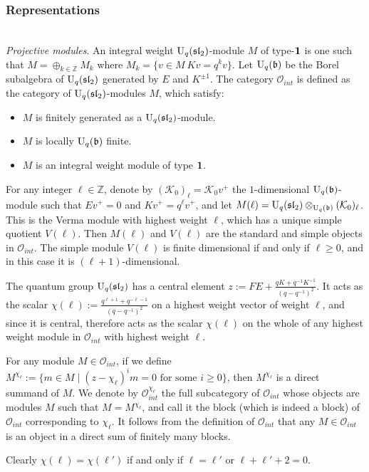\documentclass[12pt]{amsart}
\theoremstyle{definition}
\theoremstyle{remark}
\numberwithin{equation}{section}
\newcommand{\Z}{{\mathbb Z}}
\newcommand{\CO}{{\mathcal O}}
\newcommand{\CK}{{\mathcal K}}
\newcommand{\mf}{\mathfrak}
\newcommand{\fb}{{\mf b}}
\newcommand{\U}{{\rm{U}}}
\newcommand{\fsl}{{\mathfrak {sl}}}
\begin{document}
%
%
\subsubsection{Representations}{\  }\\
%
%
{\em Projective modules}.
An integral weight $\U_q(\fsl_2)$-module $M$ of type-${\bf 1}$ is one such that $M=\oplus_{k\in \Z}M_k$ where 
$M_k=\{v\in M\ K v= q^k v \}$. 
Let $\U_q(\fb)$ be the Borel subalgebra of $\U_q(\fsl_2)$ generated by $E$ and $K^{\pm 1}$.  
The category $\CO_{int}$ is defined as the category of  $\U_q(\fsl_2)$-modules $M$, which satisfy:
\begin{itemize}
\item $M$ is finitely generated as a $\U_q(\fsl_2)$-module.
\item $M$ is locally $\U_q(\fb)$ finite.
\item $M$ is an integral weight module of type ${\bf 1}$. 
\end{itemize}

For any integer $\ell\in\Z$, denote by $(\CK_0)_\ell = \CK_0v^+$ the $1$-dimensional $\U_q(\fb)$-module such that 
$E v^+=0$ and $K v^+ = q^{\ell} v^+$, and let $M(\ell)=\U_q(\fsl_2)\otimes_{\U_q(\fb)}(\CK_0)_\ell$. This is the Verma module with highest weight $\ell$, which has a unique 
simple quotient $V(\ell)$. Then $M(\ell)$ and $V(\ell)$ are the standard and simple objects in $\CO_{int}$. 
The simple module $V(\ell)$ is finite dimensional if and only if $\ell\ge 0$, and in this case it is $(\ell+1)$-dimensional. 

The quantum group $\U_q(\fsl_2)$ has a central element $z:=FE+\frac{qK+q^{-1}K^{-1}}{(q-q^{-1})^2}$. 
It acts as the scalar $\chi(\ell):=\frac{q^{\ell+1}+q^{-\ell-1}}{(q-q^{-1})^2}$ on a highest weight vector of weight $\ell$, and since 
it is central, therefore acts as the scalar $\chi(\ell)$ on the whole of any highest weight module in $\CO_{int}$ with highest weight $\ell$. 

For any module $M\in\CO_{int}$, if we 
define $M^{\chi_\ell}:=\{m\in M\mid (z-\chi_\ell)^im=0\text{ for some }i\geq 0\}$,
then $M^{\chi_\ell}$ is a direct summand of $M$. We denote by $\CO_{int}^{\chi_\ell}$ the full subcategory of $\CO_{int}$ whose objects are modules $M$ such that $M=M^{\chi_\ell}$, and call it the block (which is indeed a block)
of $\CO_{int}$ corresponding to $\chi_\ell$.
It follows from the definition of $\CO_{int}$ that any $M\in\CO_{int}$ is an object in a direct sum of finitely many blocks.

Clearly $\chi(\ell) = \chi(\ell')$ if and only if  $\ell=\ell'$  or $\ell+\ell'+2=0$.  
\end{document}
